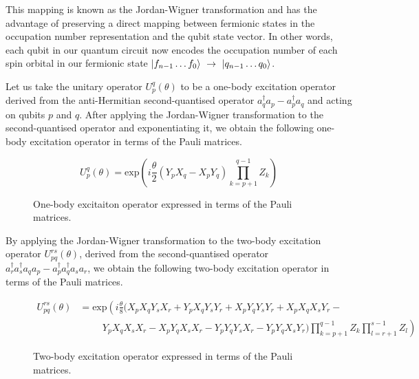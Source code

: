 This mapping is known as the Jordan-Wigner transformation \cite{Seeley2020} and has the advantage of preserving a direct mapping between fermionic states in the occupation number representation and the qubit state vector. In other words, each qubit in our quantum circuit now encodes the occupation number of each spin orbital in our fermionic state $\ket{f_{n-1} \dots f_{0}} \,\,\rightarrow\,\, \ket{q_{n-1} \dots q_{0}}$.

Let us take the unitary operator $U^q_p(\theta)$ to be a one-body excitation operator derived from the anti-Hermitian second-quantised operator $a_q^\dagger a_p - a_p^\dagger a_q$ and acting on qubits $p$ and $q$. After applying the Jordan-Wigner transformation to the second-quantised operator and exponentiating it, we obtain the following one-body excitation operator in terms of the Pauli matrices.

\begin{figure}[H]
    \centering
    \begin{equation*}
        U^q_p (\theta) =
        \text{exp} \left( i
        \frac{\theta}{2} (Y_p X_q - X_p Y_q) \prod_{k=p+1}^{q-1} Z_k \right)
    \end{equation*}
    \caption{One-body excitaiton operator expressed in terms of the Pauli matrices.}
    \label{one-body-excitation-operator}
\end{figure}

By applying the Jordan-Wigner transformation to the two-body excitation operator $U^{rs}_{pq}(\theta)$, derived from the second-quantised operator $a_r^\dagger a_s^\dagger a_q a_p - a_p^\dagger a_q^\dagger a_s a_r$, we obtain the following two-body excitation operator in terms of the Pauli matrices.

\begin{figure}[H]
    \centering
    \begin{align*}
        U^{rs}_{pq} (\theta) &= \text{exp} \left( i \frac{\theta}{8} (
        X_p X_q Y_s X_r +
        Y_p X_q Y_s Y_r +
        X_p Y_q Y_s Y_r +
        X_p X_q X_s Y_r - \right. \\
        &\left. \hspace{1cm} 
        Y_p X_q X_s X_r -
        X_p Y_q X_s X_r -
        Y_p Y_q Y_s X_r -
        Y_p Y_q X_s Y_r )
        \prod_{k=p+1}^{q-1} Z_k
        \prod_{l=r+1}^{s-1} Z_l
        \right)
    \end{align*}
    \caption{Two-body excitation operator expressed in terms of the Pauli matrices.}
\end{figure}

